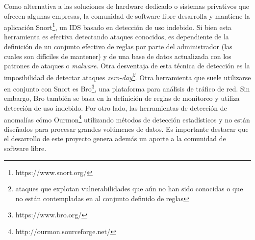 Como alternativa a las soluciones de hardware dedicado o sistemas privativos que ofrecen algunas empresas, la comunidad de software libre desarrolla y mantiene la aplicación Snort\footnote{https://www.snort.org/}, un IDS basado en detección de uso indebido. Si bien esta herramienta es efectiva detectando ataques conocidos, es dependiente de la definición de un conjunto efectivo de reglas por parte del administrador (las cuales son difíciles de mantener) y de una base de datos actualizada con los patrones de ataques o \textit{malware}. Otra desventaja de esta técnica de detección es la imposibilidad de detectar ataques \textit{zero-day\footnote{ataques que explotan vulnerabilidades que aún no han sido conocidas o que no están contempladas en al conjunto definido de reglas}}\cite{Milenkoski:2015:ECI:2808687.2808691}. Otra herramienta que suele utilizarse en conjunto con Snort es Bro\footnote{https://www.bro.org/}, una plataforma para análisis de tráfico de red. Sin embargo, Bro también se basa en la definición de reglas de monitoreo y utiliza detección de uso indebido. Por otro lado, las herramientas de detección de anomalías cómo Ourmon\footnote{http://ourmon.sourceforge.net/} utilizando métodos de detección estadísticos y no están diseñados para procesar grandes volúmenes de datos. Es importante destacar que el desarrollo de este proyecto genera además un aporte a la comunidad de software libre. \par

